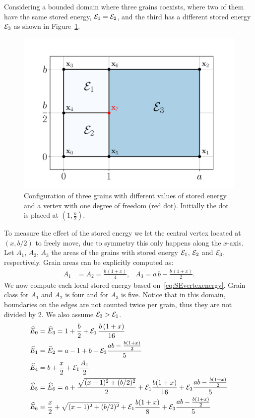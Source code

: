 Considering a bounded domain where three grains coexists,
where two of them have the same stored energy, \ie $\mathcal{E}_1=\mathcal{E}_2$, and
the third has a different stored energy $\mathcal{E}_3$ as 
shown in Figure~\ref{fig:segrains}.
%
\begin{figure}
    \centering
    \includegraphics[scale=0.5]{figures/stored_energy/SE_analysis.pdf}
    \caption[Configuration of three grains with different values of stored energy and a vertex with one degree of freedom]{Configuration of three grains with different values of stored energy and a vertex with one degree of freedom (red dot). Initially the dot is placed at $(1,\frac{b}{2})$.}
    \label{fig:segrains}
\end{figure}
%
To measure the effect of the stored energy we let the central vertex located at $(x, b/2)$ 
to freely move, due to symmetry this only happens along the $x$-axis. 
Let $A_1$, $A_2$, $A_3$ the areas of the grains with stored energy $\mathcal{E}_1$, $\mathcal{E}_2$ and $\mathcal{E}_3$, respectively.  Grain areas can be explicitly computed as:
%
\begin{align}
    A_1 &= A_2 = \frac{b\,(1+x)}{4}, & A_3 = a\,b - \frac{b\,(1+x)}{2}.
    \label{eq:SEareas}
\end{align}
%
We now compute each local stored energy based on~\ref{eq:SEvertexenergy}.
Grain class for $A_1$ and $A_2$ is four and for $A_3$ is five. 
Notice that in this domain, boundaries on the edges are not 
counted twice per grain, thus they are not divided by 2.
We also assume %
$\mathcal{E}_3>\mathcal{E}_1$.
%
\begin{align*}
\widehat{E}_0 &= \widehat{E}_3 = 1+\frac{b}{2} + \mathcal{E}_1\,\frac{b\,(1+x)}{16}\\
\widehat{E}_1 &= \widehat{E}_2 = a - 1 + b + \mathcal{E}_3 \frac{a b - \frac{b (1 + x)}{2}}{5}\\
\widehat{E}_4 &= b + \frac{x}{2} + \mathcal{E}_1\frac{A_1}{2}\\
\widehat{E}_5 &= \widehat{E}_6 = a + \frac{\sqrt{(x-1)^2 + (b/2)^2}}{2} + \mathcal{E}_1\frac{b(1+x)}{16} + \mathcal{E}_3\frac{ab - \frac{b (1 + x)}{2}}{5}\\
\widehat{E}_6 &= \frac{x}{2} + \sqrt{(x-1)^2 + (b/2)^2} + \mathcal{E}_1\frac{b (1 + x)}{8} + \mathcal{E}_3 \frac{a b - \frac{b (1 + x)}{2} }{5}
\end{align*}
